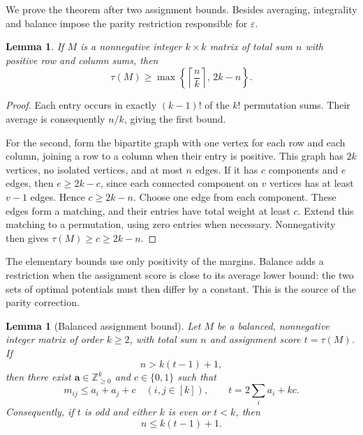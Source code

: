 \documentclass[11pt,reqno]{amsart}
\numberwithin{equation}{section}
\newtheorem{lemma}[theorem]{Lemma}
\theoremstyle{definition}
\theoremstyle{remark}
\begin{document}
We prove the theorem after two assignment bounds. Besides averaging,
integrality and balance impose the parity restriction responsible for
$\varepsilon$.

\begin{lemma}
\label{ext:elementary-assignment}
If $M$ is a nonnegative integer $k\times k$ matrix of total sum $n$
with positive row and column sums, then
\[
 \tau(M)\ge
 \max\left\{\left\lceil\frac nk\right\rceil,\,2k-n\right\}.
\]
\end{lemma}

\begin{proof}
Each entry occurs in exactly $(k-1)!$ of the $k!$ permutation sums.
Their average is consequently $n/k$, giving the first bound.

For the second, form the bipartite graph with one vertex for each row
and each column, joining a row to a column when their entry is positive.
This graph has $2k$ vertices, no isolated vertices, and at most $n$
edges.  If it has $c$ components and $e$ edges, then
$e\ge2k-c$, since each connected component on $v$ vertices has at
least $v-1$ edges.  Hence $c\ge2k-n$.  Choose one edge from each
component.  These edges form a matching, and their entries have total
weight at least $c$.  Extend this matching to a permutation, using
zero entries when necessary.  Nonnegativity then gives
$\tau(M)\ge c\ge2k-n$.
\end{proof}

The elementary bounds use only positivity of the margins. Balance
adds a restriction when the assignment score is close to its average
lower bound: the two sets of optimal potentials must then differ by
a constant. This is the source of the parity correction.

\begin{lemma}[Balanced assignment bound]
\label{ext:odd-assignment}
Let $M$ be a balanced, nonnegative integer matrix of order $k\ge2$,
with total sum $n$ and assignment score $t=\tau(M)$. If
\[
 n>k(t-1)+1,
\]
then there exist $\mathbf a\in\mathbb Z_{\ge0}^{k}$ and
$c\in\{0,1\}$ such that
\begin{equation}\label{ext:additive-cover}
 m_{ij}\le a_i+a_j+c\quad(i,j\in[k]),
 \qquad t=2\sum_i a_i+kc.
\end{equation}
Consequently, if $t$ is odd and either $k$ is even or $t<k$, then
\[
 n\le k(t-1)+1.
\]
\end{lemma}
\end{document}
